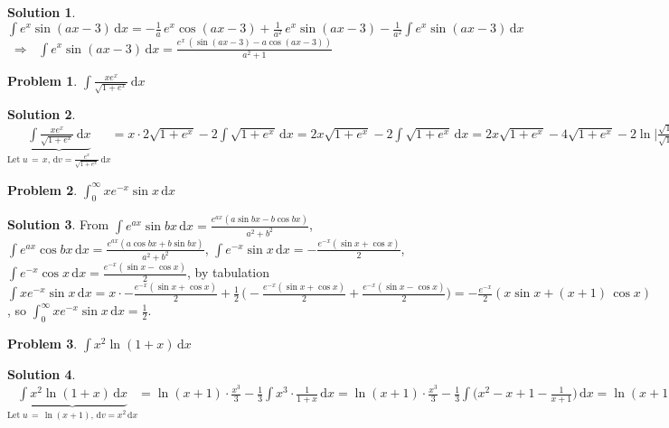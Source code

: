 \documentclass[11pt,a4paper]{article}
\newcommand{\ds}{\displaystyle}
\newcommand{\ie}{\;\Longrightarrow\;}
\theoremstyle{definition}
\newtheorem*{problem}{Problem}
\newtheorem*{solution}{Solution}
\begin{document}
\begin{solution}
  $\ds\int\!e^x \sin(ax - 3)\,\text{d}x = -\frac{1}{a}\,e^x\cos(ax - 3) + \frac{1}{a^2}\,e^x\sin(ax - 3) - \frac{1}{a^2}\int\!e^x\sin(ax - 3)\,\text{d}x$ \\$\ie$ $\ds\int\!e^x \sin(ax - 3)\,\text{d}x = \frac{e^x\,(\sin(ax - 3) - a\cos(ax - 3))}{a^2 + 1}$
\end{solution}

\begin{problem}
  $\ds\int\!\frac{xe^x}{\sqrt{1 + e^x}}\,\text{d}x$
\end{problem}

\begin{solution}
  $\ds\underbrace{\int\!\frac{xe^x}{\sqrt{1 + e^x}}\,\text{d}x}_{\text{Let}\;u\,=\,x,\,\text{d}v = \frac{e^x}{\sqrt{1 + e^x}}\,\text{d}x} = x\cdot2\sqrt{1 + e^x} - 2\int\!\sqrt{1 + e^x}\,\text{d}x = 2x\sqrt{1 + e^x} - 2\int\!\sqrt{1 + e^x}\,\text{d}x = 2x\sqrt{1 + e^x} - 4\sqrt{1 + e^x} - 2\ln\Big|\frac{\sqrt{1 + e^x} - 1}{\sqrt{1 + e^x} + 1}\Big|$
\end{solution}

\begin{problem}
  $\ds\int_0^\infty\!xe^{-x}\sin x\,\text{d}x$
\end{problem}

\begin{solution}
  From $\ds\int\!e^{ax}\sin bx\,\text{d}x = \frac{e^{ax}(a\sin bx - b\cos bx)}{a^2 + b^2}$, $\ds\int\!e^{ax}\cos bx\,\text{d}x = \frac{e^{ax}(a\cos bx + b\sin bx)}{a^2 + b^2}$, $\ds\int\!e^{-x}\sin x\,\text{d}x = -\frac{e^{-x}(\sin x + \cos x)}{2}$, $\ds\int\!e^{-x}\cos x\,\text{d}x = \frac{e^{-x}(\sin x - \cos x)}{2}$, by tabulation $\ds\int\!xe^{-x}\sin x\,\text{d}x = x\cdot-\frac{e^{-x}(\sin x + \cos x)}{2} + \frac{1}{2}\,\Big(-\frac{e^{-x}(\sin x + \cos x)}{2} + \frac{e^{-x}(\sin x - \cos x)}{2}\Big) = -\frac{e^{-x}}{2}(x\sin x + (x + 1)\,\cos x)$, so $\ds\int_0^\infty\!xe^{-x}\sin x\,\text{d}x = \frac{1}{2}$.
\end{solution}

\begin{problem}
  $\ds\int\!x^2 \ln(1 + x)\,\text{d}x$
\end{problem}

\begin{solution}
  $\ds\underbrace{\int\!x^2 \ln(1 + x)\,\text{d}x}_{\text{Let}\;u\,=\,\ln(x + 1),\,\text{d}v = x^2\,\text{d}x} = \ln(x + 1)\cdot\frac{x^3}{3} - \frac{1}{3}\int\!x^3\cdot\frac{1}{1 + x}\,\text{d}x = \ln(x + 1)\cdot\frac{x^3}{3} - \frac{1}{3}\int\!\Big(x^2 - x + 1 - \frac{1}{x + 1}\Big)\,\text{d}x = \ln(x + 1)\cdot\frac{x^3}{3} - \frac{x^3}{9} + \frac{x^2}{6} - \frac{x}{3} + \frac{\ln(x + 1)}{3}$
\end{solution}
\end{document}
